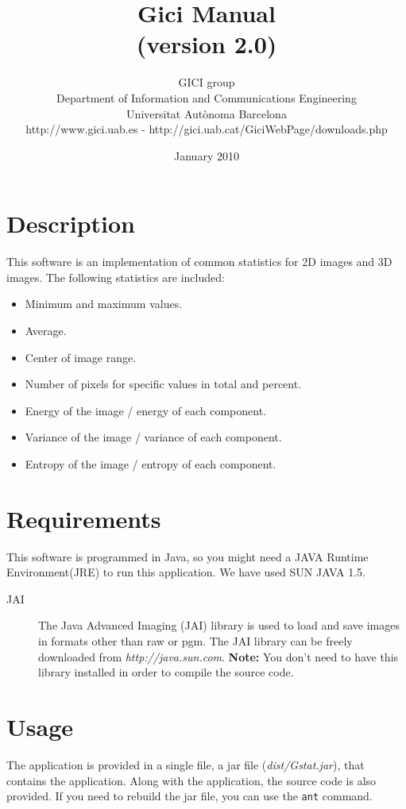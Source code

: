 \documentclass[a4paper,10pt]{article}
\title{Gici \me{} Manual \\ \small (version 2.0)}
\author{
GICI group \vspace{0.1cm} \\
\small Department of Information and Communications Engineering \\
\small Universitat Aut{\`o}noma Barcelona \\
\small http://www.gici.uab.es  -  http://gici.uab.cat/GiciWebPage/downloads.php \\
}
\date{January 2010}
\newcommand{\me}{Gstat\relax }
\begin{document}
\maketitle

\section{Description}

This software is an implementation of common statistics for 2D images and 3D images. The following statistics are included:

\begin{itemize}
\item Minimum and maximum values.
\item Average.
\item Center of image range.
\item Number of pixels for specific values in total and percent.
\item Energy of the image / energy of each component.
\item Variance of the image / variance of each component.
\item Entropy of the image / entropy of each component.
\end{itemize}

\section{Requirements}

This software is programmed in Java, so you might need a JAVA Runtime Environment(JRE) to run this application.
We have used SUN JAVA 1.5. 

\begin{description}
\item[JAI] The Java Advanced Imaging (JAI) library is used to load and save images in formats
other than raw or pgm. The JAI library can be freely downloaded from \emph{http://java.sun.com}.
\textbf{Note:} You don't need to have this library installed in order to compile the source code.
\end{description}

\section{Usage}

The application is provided in a single file, a jar file (\emph{dist/\me{}.jar}), that contains the application.
Along with the application, the source code is also provided. If you need to rebuild the jar file, you can use the \texttt{ant} command.
\end{document}
